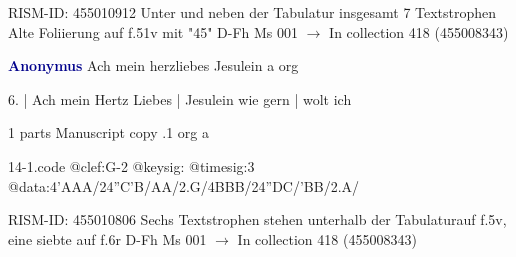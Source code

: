 \documentclass[twocolumn]{book}
\begin{document}
\newline RISM-ID: 455010912
\newline Unter und neben der Tabulatur insgesamt 7 Textstrophen
\newline Alte Foliierung auf f.51v mit "45"
\newline D-Fh  Ms 001
\newline $\rightarrow$ In collection 418 (455008343)

\newline \par \vspace{7pt} \textcolor{darkblue}{\textbf{Anonymus  }}
\newline Ach mein herzliebes Jesulein  a  
\newline org
\newline \begin{itshape}[f.5v, at left:] 6. | Ach mein Hertz Liebes | Jesulein wie gern | wolt ich\end{itshape} 
\newline \textcolor{darkblue}{}  1 parts  
\newline Manuscript copy
.1  org  a
\newline \begin{footnotesize}  \end{footnotesize}  
\begin{filecontents*}{14-1.code}
@clef:G-2
@keysig:
@timesig:3
@data:4'AAA/24''C'B/AA/2.G/4BBB/24''DC/'BB/2.A/
\end{filecontents*}
\newline
%

\newline RISM-ID: 455010806
\newline Sechs Textstrophen stehen unterhalb der Tabulaturauf f.5v, eine siebte auf f.6r
\newline D-Fh  Ms 001
\newline $\rightarrow$ In collection 418 (455008343)
\end{document}

